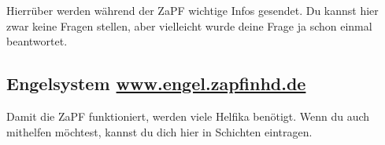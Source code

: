\noindent Hierrüber werden während der ZaPF wichtige Infos gesendet. Du kannst hier zwar keine Fragen stellen, aber vielleicht wurde deine Frage ja schon einmal beantwortet.

\subsection{Engelsystem \hfill \url{www.engel.zapfinhd.de}}

\noindent Damit die ZaPF funktioniert, werden viele Helfika benötigt. Wenn du auch mithelfen möchtest, kannst du dich hier in Schichten eintragen.